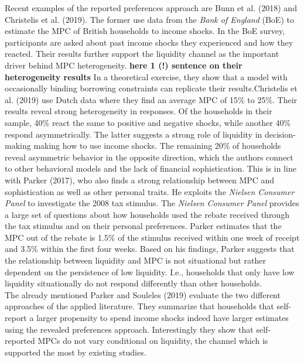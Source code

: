 Recent examples of the reported preferences approach are Bunn et al. (2018) and Christelis et al. (2019). The former use data from the \textit{Bank of England} (BoE) to estimate the MPC of British households to income shocks. In the BoE survey, participants are asked about past income shocks they experienced and how they reacted. Their results further support the liquidity channel as the important driver behind MPC heterogeneity. \textbf{here 1 (!) sentence on their heterogeneity results} In a theoretical exercise, they show that a model with occasionally binding borrowing constraints can replicate their results.Christelis et al. (2019) use Dutch data where they find an average MPC of 15\% to 25\%. Their results reveal strong heterogeneity in responses. Of the households in their sample, 40\% react the same to positive and negative shocks, while another 40\% respond asymmetrically. The latter suggests a strong role of liquidity in decision-making making how to use income shocks. The remaining 20\% of households reveal asymmetric behavior in the opposite direction, which the authors connect to other behavioral models and the lack of financial sophistication. This is in line with Parker (2017), who also finds a strong relationship between MPC and sophistication as well as other personal traits. He exploits the \textit{Nielsen Consumer Panel} to investigate the 2008 tax stimulus. The \textit{Nielsen Consumer Panel} provides a large set of questions about how households used the rebate received through the tax stimulus and on their personal preferences. Parker estimates that the MPC out of the rebate is 1.5\% of the stimulus received within one week of receipt and 3.5\% within the first four weeks. Based on his findings, Parker suggests that the relationship between liquidity and MPC is not situational but rather dependent on the persistence of low liquidity. I.e., households that only have low liquidity situationally do not respond differently than other households. \\
The already mentioned Parker and Souleles (2019) evaluate the two different approaches of the applied literature. They summarize that households that self-report a larger propensity to spend income shocks indeed have larger estimates using the revealed preferences approach. Interestingly they show that self-reported MPCs do not vary conditional on liquidity, the channel which is supported the most by existing studies. \\

